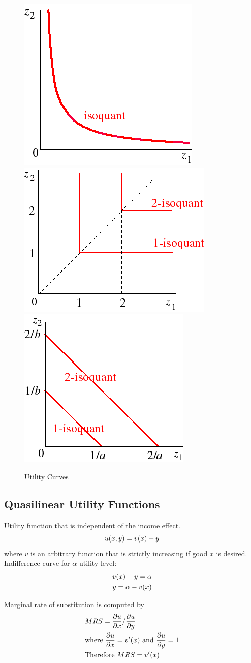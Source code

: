 \documentclass[a4paper, 12pt, reqno]{article}
\begin{document}
\begin{figure}[htp]
    \centering
    \includegraphics[width=.3\textwidth]{./Curves/CD.png}\hfill
    \includegraphics[width=.3\textwidth]{./Curves/C.png}\hfill
    \includegraphics[width=.3\textwidth]{./Curves/S.png}  
    \caption{Utility Curves}
    \label{fig:Utility Curves} 
    \end{figure}  

\subsection{Quasilinear Utility Functions}
Utility function that is independent of the income effect. 
\begin{equation}
    u(x,y) = v(x) + y
    \notag
\end{equation}
where $v$ is an arbitrary function that is strictly increasing if good $x$ is desired. \\
Indifference curve for $\alpha$ utility level:
\begin{equation}
\begin{split}    
    &v(x) + y = \alpha  \\
    &y = \alpha - v(x)
    \notag 
    \end{split}   
\end{equation} 

Marginal rate of substitution is computed by 
\begin{equation}
    \begin{split}       
    &MRS =\frac{\partial u}{\partial x} / \frac{\partial u}{ \partial y } \\
    &\mbox{where } \frac{\partial u}{\partial x}=v'(x) \mbox{ and } \frac{\partial u}{\partial y} = 1 \\
    &\mbox{Therefore } MRS = v'(x)
    \notag
    \end{split}    
\end{equation}
\end{document}
